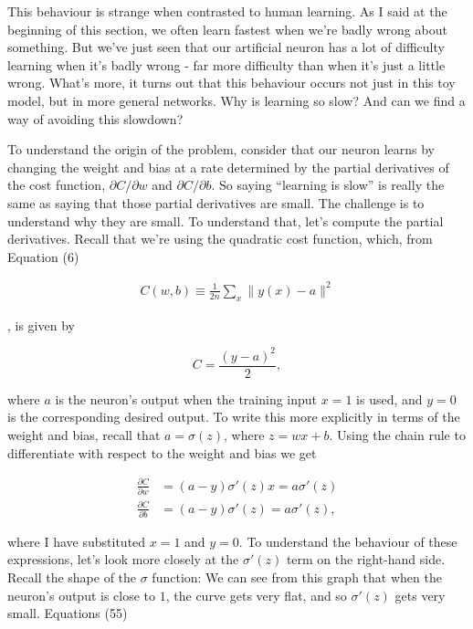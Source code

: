 This behaviour is strange when contrasted to human learning. As I said at the beginning of this section, we often learn fastest when we're badly wrong about something. But we've just seen that our artificial neuron has a lot of difficulty learning when it's badly wrong - far more difficulty than when it's just a little wrong. What's more, it turns out that this behaviour occurs not just in this toy model, but in more general networks. Why is learning so slow? And can we find a way of avoiding this slowdown?


To understand the origin of the problem, consider that our neuron learns by changing the weight and bias at a rate determined by the partial derivatives of the cost function, $\partial C/\partial w$ and $\partial C / \partial b$. So saying ``learning is slow'' is really the same as saying that those partial derivatives are small. The challenge is to understand why they are small. To understand that, let's compute the partial derivatives. Recall that we're using the quadratic cost function, which, from Equation (6)

\begin{align*}
C(w,b) \equiv \frac{1}{2n} \sum_x \| y(x) - a\|^2 \nonumber
\end{align*}

\noindent, is given by

\begin{equation}
C = \frac{(y-a)^2}{2},
\tag{54}
\end{equation}

\noindent where $a$ is the neuron's output when the training input $x = 1$ is used, and $y = 0$ is the corresponding desired output. To write this more explicitly in terms of the weight and bias, recall that $a = \sigma(z)$, where $z = wx+b$. Using the chain rule to differentiate with respect to the weight and bias we get

\begin{align}
\frac{\partial C}{\partial w} &= (a-y)\sigma'(z) x = a \sigma'(z) \tag{55} \\ \frac{\partial C}{\partial b} &= (a-y)\sigma'(z) = a \sigma'(z), \tag{56}
\end{align}

\noindent where I have substituted $x = 1$ and $y = 0$. To understand the behaviour of these expressions, let's look more closely at the $\sigma'(z)$ term on the right-hand side. Recall the shape of the $\sigma$ function: We can see from this graph that when the neuron's output is close to $1$, the curve gets very flat, and so $\sigma'(z)$ gets very small. Equations (55)

